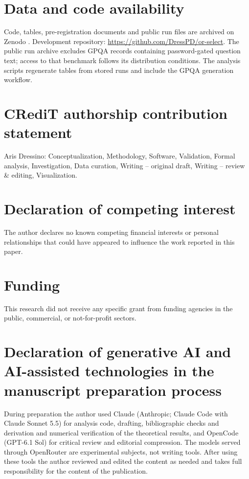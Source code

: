 \documentclass[preprint,11pt,number,sort&compress]{elsarticle}
\begin{document}
\section*{Data and code availability}
Code, tables, pre-registration documents and public run files are archived
on Zenodo \citep{dressino2026orselect}. Development repository:
\url{https://github.com/DressPD/or-select}.
The public run archive excludes GPQA records containing password-gated
question text; access to that benchmark follows its distribution conditions.
The analysis scripts regenerate tables from stored runs and include the
GPQA generation workflow.

\section*{CRediT authorship contribution statement}
Aris Dressino: Conceptualization, Methodology, Software, Validation, Formal analysis,
Investigation, Data curation, Writing -- original draft, Writing -- review \& editing,
Visualization.

\section*{Declaration of competing interest}
The author declares no known competing financial interests or personal relationships
that could have appeared to influence the work reported in this paper.

\section*{Funding}
This research did not receive any specific grant from funding agencies in the public,
commercial, or not-for-profit sectors.

\section*{Declaration of generative AI and AI-assisted technologies in the manuscript preparation process}
During preparation the author used Claude (Anthropic; Claude Code with
Claude Sonnet 5.5) for analysis code, drafting, bibliographic checks and
derivation and numerical verification of the theoretical results, and
OpenCode (GPT-6.1 Sol) for critical review and editorial compression.
The models served through OpenRouter are experimental subjects, not writing tools.
After using these tools the author reviewed and edited the content as needed and takes
full responsibility for the content of the publication.



\end{document}

